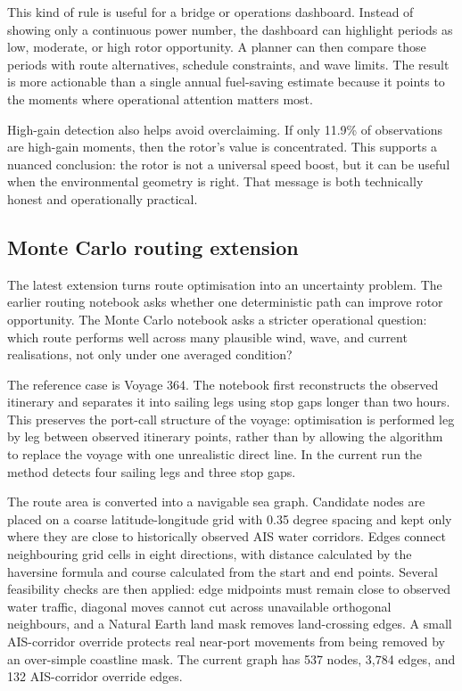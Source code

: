 \documentclass[10pt,a4paper]{article}
\begin{document}
This kind of rule is useful for a bridge or operations dashboard. Instead of
showing only a continuous power number, the dashboard can highlight periods as
low, moderate, or high rotor opportunity. A planner can then compare those
periods with route alternatives, schedule constraints, and wave limits. The
result is more actionable than a single annual fuel-saving estimate because it
points to the moments where operational attention matters most.

High-gain detection also helps avoid overclaiming. If only 11.9\% of
observations are high-gain moments, then the rotor's value is concentrated.
This supports a nuanced conclusion: the rotor is not a universal speed boost,
but it can be useful when the environmental geometry is right. That message is
both technically honest and operationally practical.

\subsection{Monte Carlo routing extension}

The latest extension turns route optimisation into an uncertainty problem. The
earlier routing notebook asks whether one deterministic path can improve rotor
opportunity. The Monte Carlo notebook asks a stricter operational question:
which route performs well across many plausible wind, wave, and current
realisations, not only under one averaged condition?

The reference case is Voyage 364. The notebook first reconstructs the observed
itinerary and separates it into sailing legs using stop gaps longer than two
hours. This preserves the port-call structure of the voyage: optimisation is
performed leg by leg between observed itinerary points, rather than by allowing
the algorithm to replace the voyage with one unrealistic direct line. In the
current run the method detects four sailing legs and three stop gaps.

The route area is converted into a navigable sea graph. Candidate nodes are
placed on a coarse latitude-longitude grid with 0.35 degree spacing and kept
only where they are close to historically observed AIS water corridors. Edges
connect neighbouring grid cells in eight directions, with distance calculated
by the haversine formula and course calculated from the start and end points.
Several feasibility checks are then applied: edge midpoints must remain close
to observed water traffic, diagonal moves cannot cut across unavailable
orthogonal neighbours, and a Natural Earth land mask removes land-crossing
edges. A small AIS-corridor override protects real near-port movements from
being removed by an over-simple coastline mask. The current graph has 537 nodes,
3,784 edges, and 132 AIS-corridor override edges.
\end{document}
